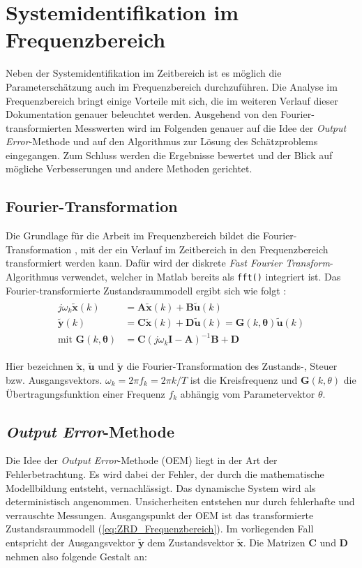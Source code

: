 \chapter{Systemidentifikation im Frequenzbereich}
Neben der Systemidentifikation im Zeitbereich ist es möglich die Parameterschätzung auch im Frequenzbereich durchzuführen. 
Die Analyse im Frequenzbereich bringt einige Vorteile mit sich, die im weiteren Verlauf dieser Dokumentation genauer 
beleuchtet werden.  Ausgehend von den Fourier-transformierten Messwerten wird im Folgenden genauer auf die Idee der 
\textit{Output Error}-Methode und auf den Algorithmus zur Lösung des Schätzproblems eingegangen. Zum Schluss werden die 
Ergebnisse  bewertet und der Blick auf mögliche Verbesserungen und andere Methoden gerichtet.


\section{Fourier-Transformation}  
Die Grundlage für die Arbeit im Frequenzbereich bildet die Fourier-Transformation \cite{Bendat1986}, mit der ein Verlauf im 
Zeitbereich in den Frequenzbereich transformiert werden kann. Dafür wird der diskrete \textit{Fast Fourier 
Transform}-Algorithmus verwendet, welcher in Matlab bereits als \texttt{fft()} integriert ist. Das Fourier-transformierte 
Zustandsraummodell ergibt sich wie folgt \cite{Klein2006}:
\begin{align}
	\begin{split}
		j\omega_{k}\mathbf{\tilde{x}}(k)  &= \mathbf{A\tilde{x}}(k) + \mathbf{B\tilde{u}}(k)  \\
		\mathbf{\tilde{y}}(k)             &= \mathbf{C\tilde{x}}(k) + \mathbf{D\tilde{u}}(k) = 
		\mathbf{G}(k,\mathbf{\theta})\mathbf{\tilde{u}}(k)  \\
		\text{mit }\mathbf{G}(k,\mathbf{\theta}) &= \mathbf{C}(j\omega_k\mathbf{I}-\mathbf{A})^{-1}\mathbf{B}+\mathbf{D}
		\label{eq:ZRD_Frequenzbereich}
	\end{split}
\end{align}

Hier bezeichnen $ \mathbf{\tilde{x}} $, $ \mathbf{\tilde{u}} $ und $ \mathbf{\tilde{y}} $ die Fourier-Transformation des 
Zustands-, Steuer bzw. Ausgangsvektors. $ \omega_k=2\pi f_k=2\pi k/T $ ist die Kreisfrequenz und $ \mathbf{G}(k,\theta) $ die 
Übertragungsfunktion einer Frequenz $ f_k $ abhängig vom Parametervektor $ \theta $.


\section{\textit{Output Error}-Methode}
Die Idee der \textit{Output Error}-Methode (OEM) liegt in der Art der Fehlerbetrachtung. Es wird dabei der Fehler, der durch 
die mathematische Modellbildung entsteht, vernachlässigt. Das dynamische System wird als deterministisch angenommen. 
Unsicherheiten entstehen nur durch fehlerhafte und verrauschte Messungen. Ausgangspunkt der OEM ist das transformierte 
Zustandsraummodell (\ref{eq:ZRD_Frequenzbereich}). Im vorliegenden Fall entspricht der Ausgangsvektor $\mathbf{\tilde{y}}$ 
dem Zustandsvektor $\mathbf{\tilde{x}}$. Die Matrizen $\mathbf{C}$ und $\mathbf{D}$ nehmen also folgende Gestalt an:

